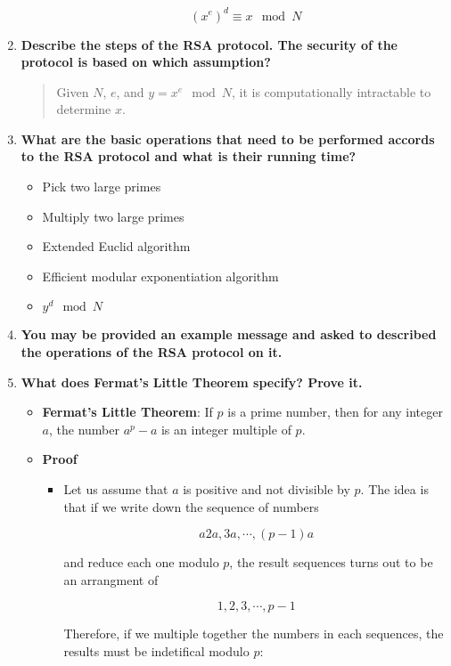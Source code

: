 \documentclass[a4paper,11pt]{article}
\begin{document}
\begin{enumerate}
\begin{itemize}
    \[(x^e)^d \equiv x \mod N\]
  \end{itemize}
\item
  \textbf{Describe the steps of the RSA protocol. The security of the
  protocol is based on which assumption?}

  \begin{quote}
  Given $N$, $e$, and $y = x^e \mod N$, it is computationally
  intractable to determine $x$.
  \end{quote}
\item
  \textbf{What are the basic operations that need to be performed
  accords to the RSA protocol and what is their running time?}

  \begin{itemize}
  \itemsep1pt\parskip0pt
  \item
    Pick two large primes
  \item
    Multiply two large primes
  \item
    Extended Euclid algorithm
  \item
    Efficient modular exponentiation algorithm
  \item
    $y^d \mod N$
  \end{itemize}
\item
  \textbf{You may be provided an example message and asked to described
  the operations of the RSA protocol on it.}
\item
  \textbf{What does Fermat's Little Theorem specify? Prove it.}

  \begin{itemize}
  \itemsep1pt\parskip0pt
  \item
    \textbf{Fermat's Little Theorem}: If $p$ is a prime number, then for
    any integer $a$, the number $a^p - a$ is an integer multiple of $p$.
  \item
    \textbf{Proof}

    \begin{itemize}
    \item
      Let us assume that $a$ is positive and not divisible by $p$. The
      idea is that if we write down the sequence of numbers

      \[a 2a, 3a, \cdots, (p - 1)a\]

      and reduce each one modulo $p$, the result sequences turns out to
      be an arrangment of

      \[1, 2, 3, \cdots, p - 1\]

      Therefore, if we multiple together the numbers in each sequences,
      the results must be indetifical modulo $p$:


\end{itemize}
\end{itemize}
\end{enumerate}
\end{document}
